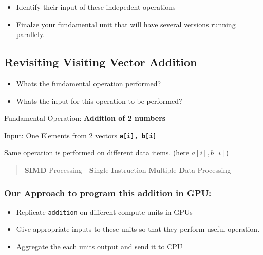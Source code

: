 \documentclass[11pt]{article}
\providecommand{\tightlist}{%
      \setlength{\itemsep}{0pt}\setlength{\parskip}{0pt}}
\begin{document}
    \begin{itemize}
\tightlist
\item
  Identify their input of these indepedent operations
\end{itemize}

    \begin{itemize}
\tightlist
\item
  Finalze your fundamental unit that will have several versions running
  parallely.
\end{itemize}

    \subsection{Revisiting Visiting Vector
Addition}\label{revisiting-visiting-vector-addition}

    \begin{itemize}
\tightlist
\item
  Whats the fundamental operation performed?
\item
  Whats the input for this operation to be performed?
\end{itemize}

    Fundamental Operation: \textbf{Addition of 2 numbers}

Input: One Elements from 2 vectors \textbf{\texttt{a{[}i{]},\ b{[}i{]}}}

    Same operation is performed on different data items. (here
\(a[i], b[i]\))

\begin{quote}
\textbf{SIMD} Processing - \textbf{S}ingle \textbf{I}nstruction
\textbf{M}ultiple \textbf{D}ata Processing
\end{quote}

    \subsubsection{Our Approach to program this addition in
GPU:}\label{our-approach-to-program-this-addition-in-gpu}

    \begin{itemize}
\tightlist
\item
  Replicate \texttt{addition} on different compute units in GPUs
\item
  Give appropriate inputs to these units so that they perform useful
  operation.
\item
  Aggregate the each units output and send it to CPU
\end{itemize}
\end{document}

